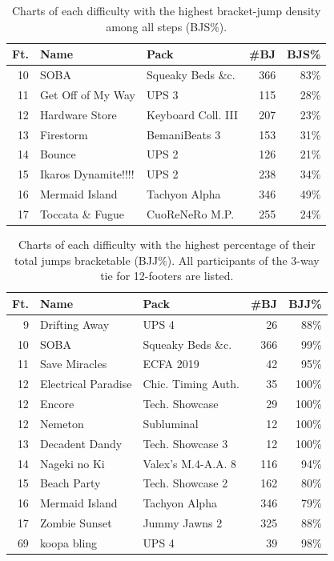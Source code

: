 \documentclass[10pt]{sigplanconf}
\begin{document}
\begin{table}[t]
	\begin{center}
		\small
	\begin{tabular}{r|l|l|r|r}
		\bf Ft. & \bf Name & \bf Pack & \bf \#BJ & \bf BJS\% \\
		\hline
		10 & SOBA			& Squeaky Beds \&c.	& 366 & 83\% \\
		11 & Get Off of My Way		& UPS 3			& 115 & 28\% \\
		12 & Hardware Store		& Keyboard Coll. III	& 207 & 23\% \\
		13 & Firestorm			& BemaniBeats 3		& 153 & 31\% \\
		14 & Bounce			& UPS 2			& 126 & 21\% \\
		15 & Ikaros Dynamite!!!!	& UPS 2			& 238 & 34\% \\
		16 & Mermaid Island		& Tachyon Alpha		& 346 & 49\% \\
		17 & Toccata \& Fugue		& CuoReNeRo M.P.	& 255 & 24\% \\
	\end{tabular}
	\end{center}
	\caption{Charts of each difficulty with the highest bracket-jump density among all steps (BJS\%).}
	\label{tab:bjs}
\end{table}
\begin{table}[t]
	\begin{center}
		\small
	\begin{tabular}{r|l|l|r|r}
		\bf Ft. & \bf Name & \bf Pack & \bf \#BJ & \bf BJJ\% \\
		\hline
		 9 & Drifting Away		& UPS 4			&  26 &  88\% \\
		10 & SOBA			& Squeaky Beds \&c.	& 366 &  99\% \\
		11 & Save Miracles		& ECFA 2019		&  42 &  95\% \\
		12 & Electrical Paradise	& Chic. Timing Auth.	&  35 & 100\% \\
		12 & Encore			& Tech. Showcase	&  29 & 100\% \\
		12 & Nemeton			& Subluminal		&  12 & 100\% \\
		13 & Decadent Dandy		& Tech. Showcase 3	&  12 & 100\% \\
		14 & Nageki no Ki		& Valex's M.4-A.A. 8	& 116 &  94\% \\
		15 & Beach Party		& Tech. Showcase 2	& 162 &  80\% \\
		16 & Mermaid Island		& Tachyon Alpha		& 346 &  79\% \\
		17 & Zombie Sunset		& Jummy Jawns 2		& 325 &  88\% \\
		69 & koopa bling		& UPS 4			&  39 &  98\% \\
	\end{tabular}
	\end{center}
	\caption{Charts of each difficulty with the highest percentage of their total jumps bracketable (BJJ\%).
	All participants of the 3-way tie for 12-footers are listed.}
	\label{tab:bjj}
\end{table}
\end{document}
